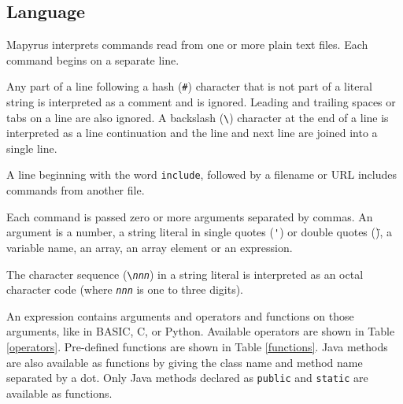 \subsection{Language}

Mapyrus interprets commands read from one or more plain text files.
Each command begins on a separate line.

Any part of a line following a hash (\texttt{\#}) character that is not part of
a literal string is interpreted as a comment and is ignored.  Leading and
trailing spaces or tabs on a line are also ignored.  A backslash
(\texttt{\textbackslash}) character at the end of a line is interpreted as a
line continuation and the line and next line are joined into a single line.

A line beginning with the word \texttt{include}, followed by a filename
or URL includes commands from another file.

Each command is passed zero or more arguments separated by commas.
An argument is a number, a string literal in single quotes (\texttt{\'})
or double quotes (\texttt{\"}), a variable name, an array, an
array element or an expression.

The character sequence (\texttt{\textbackslash{}\textit{nnn}}) in
a string literal is interpreted as an octal character code (where
\texttt{\textit{nnn}} is one to three digits).

An expression contains arguments and operators and functions
on those arguments, like in BASIC, C, or Python.
Available operators are shown in Table \ref{operators}.
Pre-defined functions are shown in Table \ref{functions}.
Java methods are also available as functions by giving the class name
and method name separated by a dot.  Only Java methods
declared as \texttt{public} and \texttt{static} are available
as functions.

